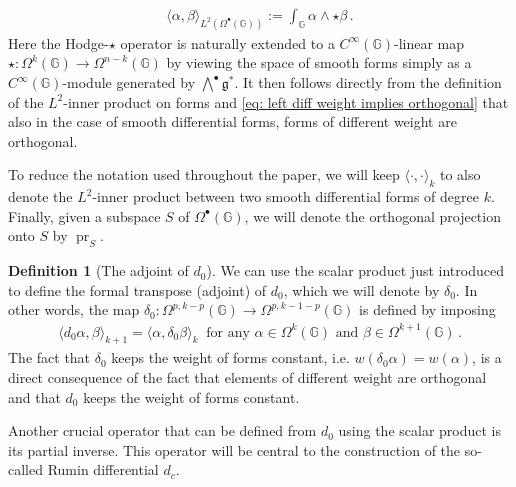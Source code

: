 \documentclass[dvipsnames]{amsart}
\theoremstyle{definition}
\newtheorem{definition}[theorem]{Definition}
\theoremstyle{definition}
\numberwithin{equation}{section}
\newcommand{\G}{\mathbb{G}}
\begin{document}
\begin{align*}
    \langle\alpha,\beta\rangle_{L^2(\Omega^\bullet(\G))}:=\int_\G\alpha\wedge\star\beta\,.
\end{align*}
Here the Hodge-$\star$ operator is naturally extended to a $C^\infty(\G)$-linear map $\star\colon\Omega^k(\G)\longrightarrow\Omega^{n-k}(\G)$ by viewing the space of smooth forms simply as a $C^\infty(\G)$-module generated by $\bigwedge^\bullet\mathfrak{g}^\ast$.
It then follows directly from the definition of the $L^2$-inner product on forms and \eqref{eq: left diff weight implies orthogonal} that also in the case of smooth differential forms, forms of different weight are orthogonal.


To reduce the notation used throughout the paper, we will keep $\langle\cdot,\cdot\rangle_k$ to also denote the $L^2$-inner product between two smooth differential forms of degree $k$. 
Finally, given a subspace $S$ of $\Omega^\bullet(\G)$, we will denote the orthogonal projection onto $S$ by $\operatorname{pr}_S$.
\begin{definition}[The adjoint of $d_0$]\label{def: adjoint of d_0} We can use the scalar product just introduced to define the formal transpose (adjoint) of $d_0$, which we will denote by $\delta_0$. In other words, the map $\delta_0\colon\Omega^{p,k-p}(\G)\to\Omega^{p,k-1-p}(\G)$ is defined by imposing
\begin{align*}
    \langle d_0\alpha,\beta\rangle_{k+1}=\langle\alpha,\delta_0\beta\rangle_k\ \text{ for any }\alpha\in\Omega^k(\G)\text{ and }\beta\in\Omega^{k+1}(\G)\,.
\end{align*}
The fact that $\delta_0$ keeps the weight of forms constant, i.e. $w(\delta_0\alpha)=w(\alpha)$, is a direct consequence of the fact that elements of different weight are orthogonal and that $d_0$ keeps the weight of forms constant.
\end{definition}
Another crucial operator that can be defined from $d_0$ using the scalar product is its partial inverse. This operator will be central to the construction of the so-called Rumin differential $d_c$.
\end{document}

